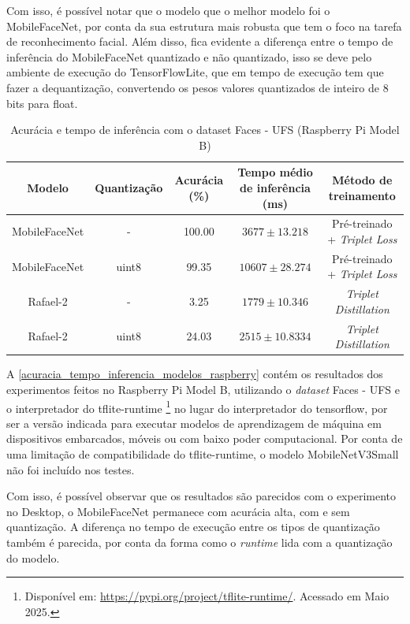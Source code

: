 Com isso, é possível notar que o modelo que o melhor modelo foi o MobileFaceNet, por conta da sua estrutura
mais robusta que tem o foco na tarefa de reconhecimento facial. Além disso, fica evidente a diferença entre
o tempo de inferência do MobileFaceNet quantizado e não quantizado, isso se deve pelo ambiente de execução
do TensorFlowLite, que em tempo de execução tem que fazer a dequantização, convertendo os pesos valores
quantizados de inteiro de 8 bits para float.


\begin{table}[htb]
\centering
\ABNTEXfontereduzida
\caption[Acurácia e tempo de inferência com o dataset Faces - UFS (Raspberry Pi Model B)]{Acurácia e tempo de inferência com o dataset Faces - UFS (Raspberry Pi Model B)}
\label{acuracia_tempo_inferencia_modelos_raspberry}
\begin{tabular}{ |c|c|c|c|c| }
	\hline
	\textbf{Modelo} & \textbf{Quantização} & \textbf{Acurácia (\%)} & \textbf{Tempo médio de inferência (ms)} & \textbf{Método de treinamento} \\
	\hline
	MobileFaceNet 	&-	& 	100.00  & $3677 \pm 13.218$ & Pré-treinado + \textit{Triplet Loss} \\
	MobileFaceNet 	&uint8	& 	 99.35  & $10607 \pm 28.274$ & Pré-treinado + \textit{Triplet Loss} \\
	Rafael-2	&-	& 	 3.25 	& $1779 \pm 10.346$ & \textit{Triplet Distillation} \\
	Rafael-2	&uint8	& 	 24.03	& $2515 \pm 10.8334$ & \textit{Triplet Distillation} \\
	\hline
\end{tabular}
\end{table}

A \autoref{acuracia_tempo_inferencia_modelos_raspberry} contém os resultados dos experimentos feitos no
Raspberry Pi Model B, utilizando o \textit{dataset} Faces - UFS e o interpretador do tflite-runtime
\footnote{Disponível em: \url{https://pypi.org/project/tflite-runtime/}. Acessado em Maio 2025.}
no lugar do interpretador do tensorflow, por ser a versão indicada para executar modelos de aprendizagem de
máquina em dispositivos embarcados, móveis ou com baixo poder computacional. Por conta de uma limitação de
compatibilidade do tflite-runtime, o modelo MobileNetV3Small não foi incluído nos testes.

Com isso, é possível observar que os resultados são parecidos com o experimento no Desktop, o MobileFaceNet
permanece com acurácia alta, com e sem quantização. A diferença no tempo de execução entre os tipos de
quantização também é parecida, por conta da forma como o \textit{runtime} lida com a quantização do modelo.

